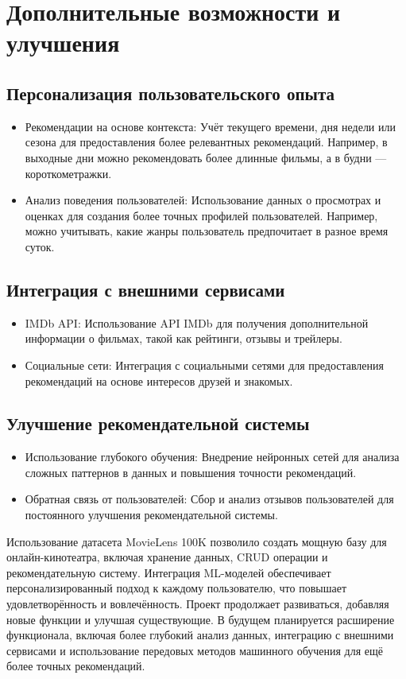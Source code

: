 \section{Дополнительные возможности и улучшения}

\subsection*{Персонализация пользовательского опыта}
\begin{itemize}
    \item Рекомендации на основе контекста: Учёт текущего времени, дня недели или сезона для предоставления более релевантных рекомендаций. Например, в выходные дни можно рекомендовать более длинные фильмы, а в будни — короткометражки.
    \item Анализ поведения пользователей: Использование данных о просмотрах и оценках для создания более точных профилей пользователей. Например, можно учитывать, какие жанры пользователь предпочитает в разное время суток.
\end{itemize}

\subsection*{Интеграция с внешними сервисами}
\begin{itemize}
    \item IMDb API: Использование API IMDb для получения дополнительной информации о фильмах, такой как рейтинги, отзывы и трейлеры.
    \item Социальные сети: Интеграция с социальными сетями для предоставления рекомендаций на основе интересов друзей и знакомых.
\end{itemize}

\subsection*{Улучшение рекомендательной системы}
\begin{itemize}
    \item Использование глубокого обучения: Внедрение нейронных сетей для анализа сложных паттернов в данных и повышения точности рекомендаций.
    \item Обратная связь от пользователей: Сбор и анализ отзывов пользователей для постоянного улучшения рекомендательной системы.
\end{itemize}

Использование датасета MovieLens 100K позволило создать мощную базу для онлайн-кинотеатра, включая хранение данных, CRUD операции и рекомендательную систему. Интеграция ML-моделей обеспечивает персонализированный подход к каждому пользователю, что повышает удовлетворённость и вовлечённость. Проект продолжает развиваться, добавляя новые функции и улучшая существующие. В будущем планируется расширение функционала, включая более глубокий анализ данных, интеграцию с внешними сервисами и использование передовых методов машинного обучения для ещё более точных рекомендаций.

\endinput